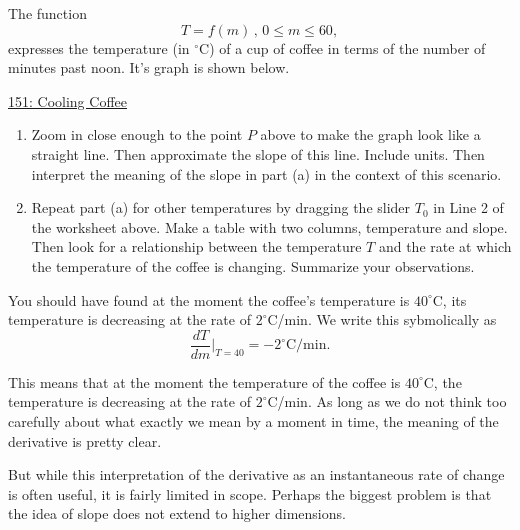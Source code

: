 \documentclass{ximera}
\begin{document}
\begin{example}  \label{Ex:KJDmft4thghhgdf}
The function 
\[
   T = f(m) \, ,  \, 0\leq m \leq 60,
\]
expresses the temperature (in $^\circ$C) of a cup of coffee in terms of the number of minutes past noon. It's graph is shown below.

\begin{onlineOnly}
    \begin{center}
\end{center}
\end{onlineOnly}

\href{https://www.desmos.com/calculator/fuftb4mq0k}{151: Cooling Coffee}


\begin{enumerate}
\item Zoom in close enough to the point $P$ above to make the graph look like a straight line. Then approximate the slope of this line. Include units. Then interpret the meaning of the slope in part (a) in the context of this scenario.

\begin{freeResponse}
\end{freeResponse}



\item Repeat part (a) for other temperatures by dragging the slider $T_0$ in Line 2 of the worksheet above. Make a table with two columns, temperature and slope. Then look for a relationship between the temperature $T$ and the rate at which the temperature of the coffee is changing. Summarize your observations.
\begin{freeResponse}
\end{freeResponse}

\end{enumerate}

You should have found at the moment the coffee's temperature is $40^\circ$C, its temperature is decreasing at the rate of $2^\circ$C/min. We write this sybmolically as
\[
    \frac{dT}{dm} \Big|_{T=40} = -2^\circ\text{C}/\text{min}.
\]

This means that at the moment the temperature of the coffee is $40^\circ$C, the temperature is decreasing at the rate of $2^\circ$C/min. As long as we do not think too carefully about what exactly we mean by a moment in time, the meaning of the derivative is pretty clear.

But while this interpretation of the derivative as an instantaneous rate of change is often useful, it is fairly limited in scope. Perhaps the biggest problem is that the idea of slope does not extend to higher dimensions. %

\end{example}
\end{document}

